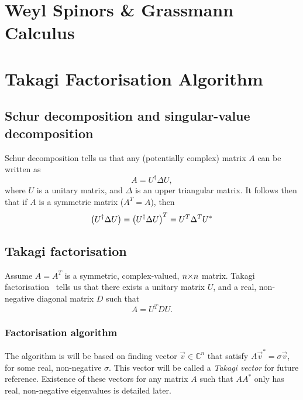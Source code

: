 \documentclass[../main.tex]{subfiles}
\begin{document}
\chapter{Weyl Spinors \& Grassmann Calculus}
\label{app:chap:weyl_grassmann}


\chapter{Takagi Factorisation Algorithm}
\label{app:chap:takagi}
\section{Schur decomposition and singular-value decomposition}
Schur decomposition tells us that any (potentially complex) matrix \(A\) can be written as
\[
  A = U^\dagger \Delta U,
\]
where \(U\) is a unitary matrix, and \(\Delta\) is an upper triangular matrix.
It follows then that if \(A\) is a symmetric matrix (\(A^T = A\)), then
\[
  \left(U^\dagger \Delta U\right) = \left(U^\dagger \Delta U\right)^T = U^T \Delta^T U^\ast
\]

\section{Takagi factorisation}
Assume \(A = A^T\) is a symmetric, complex-valued, \(n {\times} n\) matrix.
Takagi factorisation~\cite{Horn} tells us that there exists a unitary matrix \(U\), and a real, non-negative diagonal matrix \(D\) such that
\begin{equation}
  \label{eq:takagi}
  A = U^T D U.
\end{equation}

\subsection{Factorisation algorithm}
The algorithm is will be based on finding vector \(\vec{v} \in  \mathbb{C}^n\) that satisfy \(A \vec{v}^* = \sigma \vec{v}\), for some real, non-negative \(\sigma\).
This vector will be called a \emph{Takagi vector} for future reference.
Existence of these vectors for any matrix \(A\) such that \(AA^\ast\) only has real, non-negative eigenvalues is detailed later.
\end{document}
